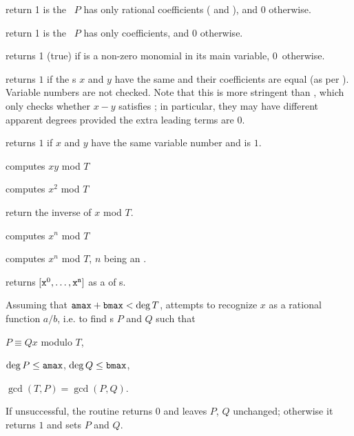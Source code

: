  return 1 is the ~$P$ has only
rational coefficients ( and ), and 0 otherwise.

 return 1 is the ~$P$ has only
 coefficients, and 0 otherwise.

 returns 1 (true) if  is a non-zero
monomial in its main variable, 0~otherwise.

 returns $1$ if the s $x$ and $y$
have the same  and their coefficients are equal (as per
). Variable numbers are not checked. Note that this is more
stringent than , which only checks whether $x - y$ satisfies
; in particular, they may have different apparent degrees provided
the extra leading terms are $0$.

 returns $1$ if $x$ and $y$
have the same variable number and  is $1$.
\smallskip

 computes $xy$ mod $T$

 computes $x^2$ mod $T$

 return the inverse of $x$ mod $T$.

 computes $x^n$ mod $T$

 computes $x^n$ mod $T$,
$n$ being an .

 returns $[{\tt x}^0,
\dots, {\tt x}^{\tt n}]$ as a  of s.

Assuming that ${\tt amax}+{\tt bmax}<\deg T$,
attempts to recognize $x$ as a rational function $a/b$, i.e. to find s $P$ and $Q$ such that

\item $P \equiv Q x$ modulo $T$,

\item $\deg P \leq {\tt amax}$, $\deg Q \leq {\tt bmax}$,

\item $\gcd(T,P) = \gcd(P,Q)$.

\noindent If unsuccessful, the routine returns $0$ and leaves $P$, $Q$
unchanged; otherwise it returns $1$ and sets $P$ and $Q$.

